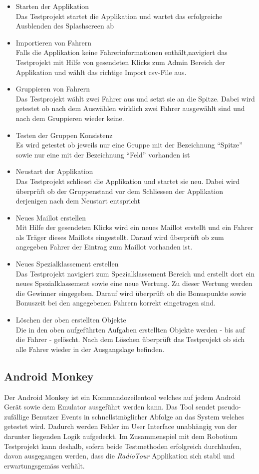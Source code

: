 \begin{itemize}
\item Starten der Applikation\\
Das Testprojekt startet die Applikation und wartet das erfolgreiche Ausblenden des Splashscreen ab
\item Importieren von Fahrern\\
Falls die Applikation keine Fahrerinformationen enthält,navigiert das Testprojekt mit Hilfe von gesendeten Klicks zum Admin Bereich der Applikation und wählt das richtige Import csv-File aus.
\item Gruppieren von Fahrern\\
Das Testprojekt wählt zwei Fahrer aus und setzt sie an die Spitze. Dabei wird getestet ob nach dem Auswählen wirklich zwei Fahrer ausgewählt sind und nach dem Gruppieren wieder keine.
\item Testen der Gruppen Konsistenz\\
Es wird getestet ob jeweils nur eine Gruppe mit der Bezeichnung "`Spitze"' sowie nur eine mit der Bezeichnung "`Feld"' vorhanden ist
\item Neustart der Applikation\\
Das Testprojekt schliesst die Applikation und startet sie neu. Dabei wird überprüft ob der Gruppenstand vor dem Schliessen der Applikation derjenigen nach dem Neustart entspricht
\item Neues Maillot erstellen\\
Mit Hilfe der gesendeten Klicks wird ein neues Maillot erstellt und ein Fahrer als Träger dieses Maillots eingestellt. Darauf wird überprüft ob zum angegeben Fahrer der Eintrag zum Maillot vorhanden ist.
\item Neues Spezialklassement erstellen\\
Das Testprojekt navigiert zum Spezialklassement Bereich und erstellt dort ein neues Spezialklassement sowie eine neue Wertung. Zu dieser Wertung werden die Gewinner eingegeben. Darauf wird überprüft ob die Bonuspunkte sowie Bonuszeit bei den angegebenen Fahrern korrekt eingetragen sind.
\item Löschen der oben erstellten Objekte \\
Die in den oben aufgeführten Aufgaben erstellten Objekte werden - bis auf die Fahrer -  gelöscht. Nach dem Löschen überprüft das Testprojekt ob sich alle Fahrer wieder in der Ausgangslage befinden.
\end{itemize}

\subsection{Android Monkey}
Der Android Monkey ist ein Kommandozeilentool welches auf jedem Android Gerät sowie dem Emulator ausgeführt werden kann. Das Tool sendet pseudo-zufällige Benutzer Events in schnellstmöglicher Abfolge an das System welches getestet wird. Dadurch werden Fehler im User Interface unabhängig von der darunter liegenden Logik aufgedeckt. Im Zusammenspiel mit dem Robotium Testprojekt kann deshalb, sofern beide Testmethoden erfolgreich durchlaufen, davon ausgegangen werden, dass die \textit{RadioTour} Applikation sich stabil und erwartungsgemäss verhält.

